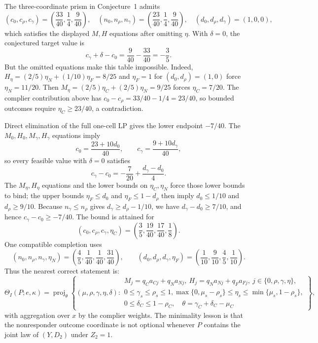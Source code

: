 \documentclass[11pt]{article}
\theoremstyle{definition}
\theoremstyle{plain}
\theoremstyle{remark}
\begin{document}
The three-coordinate prism in Conjecture~1 admits
\[
(c_0,c_\rho,c_\gamma)=\left(\frac{33}{40},\frac14,\frac9{40}\right),\quad
(n_0,n_\rho,n_\gamma)=\left(\frac{23}{40},\frac14,\frac9{40}\right),\quad
(d_0,d_\rho,d_\gamma)=(1,0,0),
\]
which satisfies the displayed \(M,H\) equations after omitting \(\eta\).
With \(\delta=0\), the conjectured target value is
\[
c_\gamma+\delta-c_0=\frac9{40}-\frac{33}{40}=-\frac35.
\]
But the omitted equations make this table impossible.
Indeed, \(H_\eta=(2/5)\eta_N+(1/10)\eta_F=8/25\) and \(\eta_F=1\) for \((d_0,d_\rho)=(1,0)\) force \(\eta_N=11/20\).
Then \(M_\eta=(2/5)\eta_C+(2/5)\eta_N=9/25\) forces \(\eta_C=7/20\).
The complier contribution above has \(c_0-c_\rho=33/40-1/4=23/40\), so bounded outcomes require \(\eta_C\ge23/40\), a contradiction.

Direct elimination of the full one-cell LP gives the lower endpoint \(-7/40\).
The \(M_0,H_0,M_\gamma,H_\gamma\) equations imply
\[
c_0=\frac{23+10d_0}{40},\qquad
c_\gamma=\frac{9+10d_\gamma}{40},
\]
so every feasible value with \(\delta=0\) satisfies
\[
c_\gamma-c_0=-\frac7{20}+\frac{d_\gamma-d_0}{4}.
\]
The \(M_\eta,H_\eta\) equations and the lower bounds on \(\eta_C,\eta_N\) force those lower bounds to bind; the upper bounds \(\eta_F\le d_0\) and \(\eta_F\le1-d_\rho\) then imply \(d_0\le1/10\) and \(d_\rho\ge9/10\).
Because \(n_\gamma\le n_\rho\) gives \(d_\gamma\ge d_\rho-1/10\), we have \(d_\gamma-d_0\ge7/10\), and hence \(c_\gamma-c_0\ge-7/40\).
The bound is attained for
\[
(c_0,c_\rho,c_\gamma,\eta_C)=
\left(\frac35,\frac{19}{40},\frac{17}{40},\frac18\right).
\]
One compatible completion uses
\[
(n_0,n_\rho,n_\gamma,\eta_N)=
\left(\frac45,\frac1{40},\frac1{40},\frac{31}{40}\right),
\qquad
(d_0,d_\rho,d_\gamma,\eta_F)=
\left(\frac1{10},\frac9{10},\frac45,\frac1{10}\right).
\]
Thus the nearest correct statement is:
\[
\Theta_I(P;e,\kappa)
=\operatorname{proj}_{\theta}
\left\{
(\mu,\rho,\gamma,\eta,\delta):
\begin{array}{l}
M_j=q_Ca_{Cj}+q_Na_{Nj},\ H_j=q_Na_{Nj}+q_Fa_{Fj},\ j\in\{0,\rho,\gamma,\eta\},\\
0\le\gamma_s\le\rho_s\le1,
\max\{0,\mu_s-\rho_s\}\le\eta_s\le\min\{\mu_s,1-\rho_s\},\\
0\le\delta_C\le1-\rho_C,\quad
\theta=\gamma_C+\delta_C-\mu_C
\end{array}
\right\},
\]
with aggregation over \(x\) by the complier weights.
The minimality lesson is that the nonresponder outcome coordinate is not optional whenever \(P\) contains the joint law of \((Y,D_2)\) under \(Z_2=1\).
\end{document}
